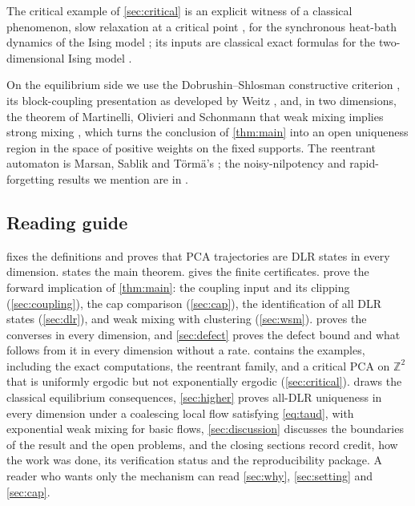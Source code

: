 \documentclass[11pt]{article}
\theoremstyle{plain}
\theoremstyle{definition}
\theoremstyle{remark}
\newcommand{\Z}{\mathbb{Z}}
\begin{document}
The critical example of \cref{sec:critical} is an explicit witness of a classical phenomenon, slow relaxation at a critical point \cite{Holley85,MS93,LS12}, for the synchronous heat-bath dynamics of the Ising model \cite{KV80,DLR02,CNP01}; its inputs are classical exact formulas for the two-dimensional Ising model \cite{Yang52,Chang52,MPW63,MW73}.

On the equilibrium side we use the Dobrushin--Shlosman constructive criterion \cite{DS85}, its block-coupling presentation as developed by Weitz \cite{Weitz05}, and, in two dimensions, the theorem of Martinelli, Olivieri and Schonmann that weak mixing implies strong mixing \cite{MOS94}, which turns the conclusion of \cref{thm:main} into an open uniqueness region in the space of positive weights on the fixed supports. The reentrant automaton is Marsan, Sablik and T\"orm\"a's \cite{MST26}; the noisy-nilpotency and rapid-forgetting results we mention are in \cite{MSTaati19,MT26}.

\subsection{Reading guide}

 fixes the definitions and proves that PCA trajectories are DLR states in every dimension.  states the main theorem.  gives the finite certificates.  prove the forward implication of \cref{thm:main}: the coupling input and its clipping (\cref{sec:coupling}), the cap comparison (\cref{sec:cap}), the identification of all DLR states (\cref{sec:dlr}), and weak mixing with clustering (\cref{sec:wsm}).  proves the converses in every dimension, and \cref{sec:defect} proves the defect bound and what follows from it in every dimension without a rate.  contains the examples, including the exact computations, the reentrant family, and a critical PCA on $\Z^2$ that is uniformly ergodic but not exponentially ergodic (\cref{sec:critical}).  draws the classical equilibrium consequences, \cref{sec:higher} proves all-DLR uniqueness in every dimension under a coalescing local flow satisfying \eqref{eq:taud}, with exponential weak mixing for basic flows, \cref{sec:discussion} discusses the boundaries of the result and the open problems, and the closing sections record credit, how the work was done, its verification status and the reproducibility package. A reader who wants only the mechanism can read \cref{sec:why}, \cref{sec:setting} and \cref{sec:cap}.
\end{document}

